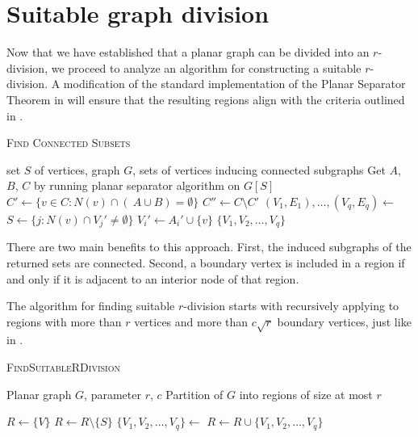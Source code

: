 \section{Suitable graph division}
\label{suitableSection}

Now that we have established that a planar graph can be divided into an $r$-division, we proceed to analyze an algorithm for constructing a suitable $r$-division. A modification of the standard implementation of the Planar Separator Theorem in  will ensure that the resulting regions align with the criteria outlined in .

\begin{algorithm}[H]
\caption{\textsc{Find Connected Subsets}}\label{connected}
\begin{algorithmic}[1]
\Require set $S$ of vertices, graph $G$,
\Ensure sets of vertices inducing connected subgraphs
    \State Get $A$, $B$, $C$ by running planar separator algorithm on $G[S]$
    \State $C' \gets \{ v \in C : N(v) \cap (\ A \cup B) = \emptyset \}$
    \State $C'' \gets C \setminus C'$
    \State $(V_1, E_1), \dots, (V_q, E_q) \gets$ 
        \State $S \gets \{ j : N(v) \cap V_j' \neq \emptyset \}$
            \State $V_i' \gets A_i' \cup \{v\}$ 
        \EndIf
    \EndFor
    \State \Return $\{V_1, V_2, \dots, V_q\}$
\EndProcedure
\end{algorithmic}
\end{algorithm}

There are two main benefits to this approach. First, the induced subgraphs of the returned sets are connected. Second, a boundary vertex is included in a region if and only if it is adjacent to an interior node of that region.

The algorithm for finding suitable $r$-division starts with recursively applying  to regions with more than $r$ vertices and more than $c \sqrt{r}$ boundary vertices, just like in .

\begin{algorithm}
\caption{\textsc{FindSuitableRDivision}}\label{findRDivision}
\begin{algorithmic}[1]
\Require Planar graph $G$, parameter $r$, $c$
\Ensure Partition of $G$ into regions of size at most $r$

    \State $R \gets \{V\}$
        \State $R \gets R \setminus \{S\}$
        \State $\{V_1, V_2, \dots, V_q\} \gets$ 
        \State $R \gets R \cup \{V_1, V_2, \dots, V_q\}$
    \EndWhile
    \State {}
\EndProcedure

\end{algorithmic}
\end{algorithm}

